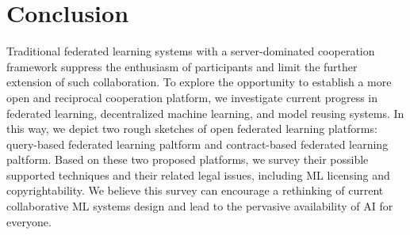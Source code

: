 \section{Conclusion}
Traditional federated learning systems with a server-dominated cooperation framework suppress the enthusiasm of participants and limit the further extension of such collaboration. 
To explore the opportunity to establish a more open and reciprocal cooperation platform, we investigate current progress in federated learning, decentralized machine learning, and model reusing systems. 
In this way, we depict two rough sketches of open federated learning platforms: query-based federated learning paltform and contract-based federated learning paltform. 
Based on these two proposed platforms, we survey their possible supported techniques and their related legal issues, including ML licensing and copyrightability. 
We believe this survey can encourage a rethinking of current collaborative ML systems design and lead to the pervasive availability of AI for everyone.






